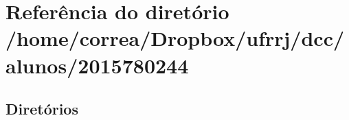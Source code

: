 \section{Referência do diretório /home/correa/\+Dropbox/ufrrj/dcc/alunos/2015780244}
\label{dir_567e62300f4730f1de20e1d0c468f57f}
\subsection*{Diretórios}
\begin{DoxyCompactItemize}
\end{DoxyCompactItemize}
